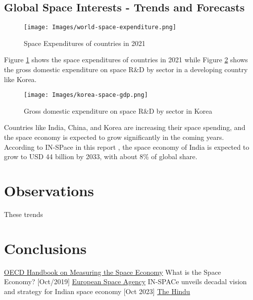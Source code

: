 \documentclass[12pt]{article}
\begin{document}
\subsection{Global Space Interests - Trends and Forecasts}

\begin{figure}[h]
    \centering
    \texttt{[image: Images/world-space-expenditure.png]}
    \caption{Space Expenditures of countries in 2021}
    \label{fig:space-interests}
\end{figure}

Figure \ref{fig:space-interests} shows the space expenditures of countries in 2021 while Figure \ref{fig:korea-space-gdp} shows the gross domestic expenditure on space R\&D by sector in a developing country like Korea.

\begin{figure}[h]
    \centering
    \texttt{[image: Images/korea-space-gdp.png]}
    \caption{Gross domestic expenditure on space R\&D by sector in Korea}
    \label{fig:korea-space-gdp}
\end{figure}

Countries like India, China, and Korea are increasing their space spending, and the space economy is expected to grow significantly in the coming years. According to IN-SPace in this report \cite{news:thehindu}, the space economy of India is expected to grow to USD 44 billion by 2033, with about 8\% of global share.


\section{Observations}
These trends

\section{Conclusions}

\begin{thebibliography}{9}
    \href{https://www.oecd.org/publications/oecd-handbook-on-measuring-the-space-economy-2nd-edition-8bfef437-en.htm}{OECD Handbook on Measuring the Space Economy}
    What is the Space Economy? [Oct/2019] \href{https://space-economy.esa.int/article/33/what-is-the-space-economy#_ftn1}{European Space Agency}
     IN-SPACe unveils decadal vision and strategy for Indian space economy [Oct 2023]
    \href{https://www.thehindu.com/sci-tech/science/indias-space-economy-has-potential-to-reach-35200-crore-44-billion-by-2033-with-about-8-of-global-share/article67403193.ece}{The Hindu}
\end{thebibliography}
\end{document}
